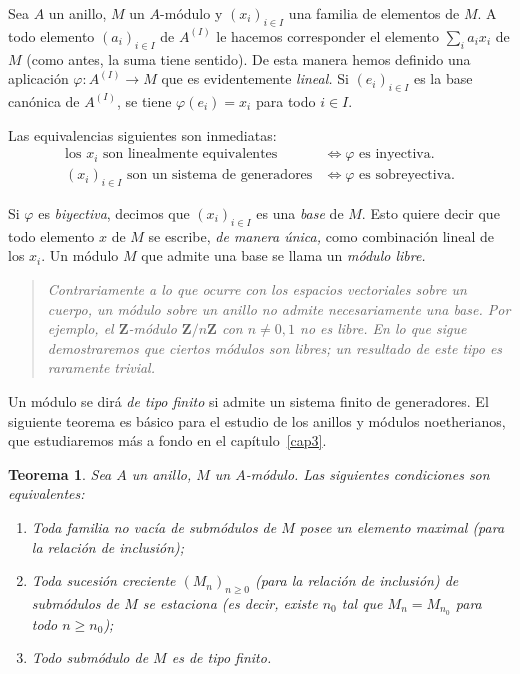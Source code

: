 \documentclass[bibtotoc,leqno,spanish]{amsbook}
\newcommand{\ZZ}{\mathbf{Z}}
\renewcommand{\to}[1][]{\xrightarrow{#1}}
\numberwithin{equation}{section}
\newenvironment{comm}%
	{\begin{quotation}\itshape\Small}
	{\end{quotation}}
\theoremstyle{note}
\theoremstyle{note}
\newtheorem{theorem}{Teorema}
\theoremstyle{rem}
\numberwithin{theorem}{section}
\numberwithin{proposition}{section}
\numberwithin{definition}{section}
\numberwithin{lemma}{section}
\numberwithin{corollary}{section}
\numberwithin{example}{section}
\numberwithin{footnote}{section}%
\begin{document}
Sea $A$ un anillo, $M$ un $A$-m\'odulo y $(x_{i})_{i\in I}$ una familia de elementos
de $M$. A todo elemento
$(a_{i})_{i\in I}$ de $A^{(I)}$ le hacemos corresponder el elemento $\sum_{i}a_{i}x_{i}$
de $M$ (como antes, la
suma tiene sentido). De esta manera hemos definido una aplicaci\'on
$\varphi:A^{(I)}\to M$ que es evidentemente
{\em lineal.} Si $(e_{i})_{i\in I}$ es la base can\'onica de $A^{(I)}$, se
tiene $\varphi(e_{i}) = x_{i}$ para todo
$i\in I$.

Las equivalencias siguientes son inmediatas:
\begin{align}
\text{los $x_{i}$ son linealmente equivalentes} &\iff \text{$\varphi$ es inyectiva.}\\
\text{$(x_{i})_{i\in I}$ son un sistema de generadores} &\iff \text{$\varphi$ es sobreyectiva.}
\end{align}

Si $\varphi$ es {\em biyectiva}, decimos que $(x_{i})_{i\in I}$ es una {\em base}
de $M$. Esto quiere decir que
todo elemento $x$ de $M$ se escribe, {\em de manera \'unica,} como combinaci\'on lineal
de los $x_{i}$. Un m\'odulo
$M$ que admite una base se llama un {\em m\'odulo libre.}

\begin{comm}
Contrariamente a lo que ocurre con los espacios vectoriales sobre un cuerpo, un
m\'odulo sobre un
anillo no admite necesariamente una base. Por ejemplo, el $\ZZ$-m\'odulo $\ZZ/n\ZZ$
con $n\neq 0,1$
no es libre.
En lo que sigue demostraremos que ciertos m\'odulos son libres; un resultado de este
tipo es raramente trivial.
\end{comm}

Un m\'odulo se dir\'a {\em de tipo finito} si admite un sistema finito de
generadores. El siguiente teorema
es b\'asico para el estudio de los anillos y m\'odulos noetherianos, que estudiaremos
m\'as a fondo en el cap\'itulo~\ref{cap3}.

\begin{theorem}\label{teo1.4.1}
Sea $A$ un anillo, $M$ un $A$-m\'odulo. Las siguientes condiciones son equivalentes:
\begin{enumerate}
\item Toda familia no vac\'ia de subm\'odulos de $M$ posee un elemento maximal
(para la relaci\'on de inclusi\'on);
\item Toda sucesi\'on creciente $(M_{n})_{n\geq 0}$ (para la relaci\'on de inclusi\'on)
de subm\'odulos
de $M$ se estaciona (es decir, existe $n_{0}$ tal que $M_{n} = M_{n_{0}}$ para
todo $n\geq n_{0}$);
\item Todo subm\'odulo de $M$ es de tipo finito.
\end{enumerate}
\end{theorem}
\end{document}
